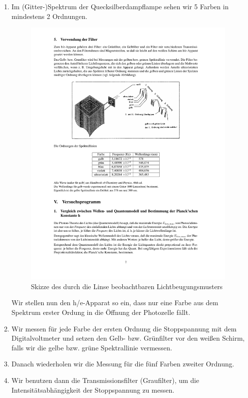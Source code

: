 \documentclass[12px]{scrartcl}
\begin{document}
\begin{enumerate}
\item Im (Gitter-)Spektrum der Quecksilberdampflampe sehen wir 5 Farben in mindestens 2 Ordnungen.
\begin{figure}[htbp] 
  \centering
    \includegraphics[trim = 35mm 150mm 1mm 60mm, clip, scale = 1]{abb5.pdf}
  	\caption[Skizze des durch die Linse beobachtbaren Lichtbeugungsmusters]{Skizze des durch die Linse beobachtbaren Lichtbeugungsmusters\footnotemark}
  \label{fig:schaltskizze}
\end{figure}
	
Wir stellen nun den h/e-Apparat so ein, dass nur eine Farbe aus dem Spektrum erster Ordung in die Öffnung der Photozelle fällt.
\item Wir messen für jede Farbe der ersten Ordnung die Stoppspannung mit dem Digitalvoltmeter und setzen den
Gelb- bzw. Grünfilter vor den weißen Schirm, falls wir die gelbe bzw. grüne Spektrallinie vermessen.
\item Danach wiederholen wir die Messung für die fünf Farben zweiter Ordnung.
\item Wir benutzen dann die Transmissionsfilter (Graufilter), um die Intensitätsabhängigkeit der Stoppspannung zu messen.
\end{enumerate}
\end{document}
